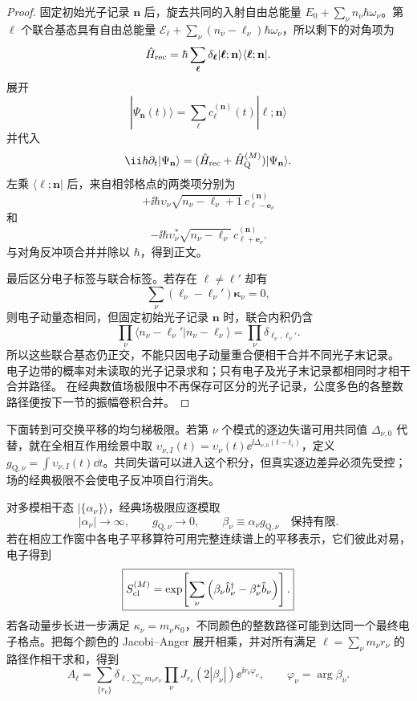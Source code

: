\begin{proof}
固定初始光子记录 $\mathbf n$ 后，旋去共同的入射自由总能量 $E_0+\sum_\nu n_\nu\hbar\omega_\nu$。第 $\boldsymbol\ell$ 个联合基态具有自由总能量 $\mathcal E_{\boldsymbol\ell}+\sum_\nu(n_\nu-\ell_\nu)\hbar\omega_\nu$，所以剩下的对角项为
\[
\hat H_{\rm rec}
=
\hbar\sum_{\boldsymbol\ell}
\delta_{\boldsymbol\ell}
|\boldsymbol\ell;\mathbf n\rangle\langle\boldsymbol\ell;\mathbf n|.
\]
展开
\[
|\Psi_{\mathbf n}(t)\rangle
=
\sum_{\boldsymbol\ell}
c_{\boldsymbol\ell}^{(\mathbf n)}(t)
|\boldsymbol\ell;\mathbf n\rangle
\]
并代入
\[
\ii\hbar\partial_t|\Psi_{\mathbf n}\rangle
=
(\hat H_{\rm rec}+\hat H_{\rm Q}^{(M)})
|\Psi_{\mathbf n}\rangle.
\]
左乘 $\langle\boldsymbol\ell;\mathbf n|$ 后，来自相邻格点的两类项分别为
\[
+\ii\hbar
\upsilon_\nu
\sqrt{n_\nu-\ell_\nu+1}\,
c_{\boldsymbol\ell-\mathbf e_\nu}^{(\mathbf n)}
\]
和
\[
-\ii\hbar
\upsilon_\nu^*
\sqrt{n_\nu-\ell_\nu}\,
c_{\boldsymbol\ell+\mathbf e_\nu}^{(\mathbf n)}.
\]
与对角反冲项合并并除以 $\hbar$，得到正文。

最后区分电子标签与联合标签。若存在
$\boldsymbol\ell\neq\boldsymbol\ell\prime$ 却有
\[
\sum_\nu(\ell_\nu-\ell_\nu\prime)\boldsymbol\kappa_\nu=0,
\]
则电子动量态相同，但固定初始光子记录 $\mathbf n$ 时，联合内积仍含
\[
\prod_\nu\langle n_\nu-\ell_\nu\prime|n_\nu-\ell_\nu\rangle
=\prod_\nu\delta_{\ell_\nu,\ell_\nu\prime}.
\]
所以这些联合基态仍正交，不能只因电子动量重合便相干合并不同光子末记录。
电子边带的概率对未读取的光子记录求和；只有电子及光子末记录都相同时才相干合并路径。
在经典数值场极限中不再保存可区分的光子记录，公度多色的各整数路径便按下一节的振幅卷积合并。
\end{proof}


下面转到可交换平移的均匀梯极限。若第 $\nu$ 个模式的逐边失谐可用共同值 $\Delta_{\nu,0}$ 代替，就在全相互作用绘景中取 $\upsilon_{\nu,I}(t)=\upsilon_\nu(t)\ee^{\ii\Delta_{\nu,0}(t-t_i)}$，定义 $g_{\mathrm Q,\nu}=\int\upsilon_{\nu,I}(t)\dd t$。共同失谐可以进入这个积分，但真实逐边差异必须先受控；场的经典极限不会使电子反冲项自行消失。

对多模相干态
$|\{\alpha_\nu\}\rangle$，经典场极限应逐模取
\[
|\alpha_\nu|\to\infty,
\qquad
g_{\mathrm Q,\nu}\to0,
\qquad
\beta_\nu
\equiv
\alpha_\nu g_{\mathrm Q,\nu}
\quad\text{保持有限}.
\]
若在相应工作窗中各电子平移算符可用完整连续谱上的平移表示，它们彼此对易，电子得到
\begin{equation}
\boxed{
 S_{\rm cl}^{(M)}
 =
 \exp\!\left[
 \sum_\nu
 \left(
 \beta_\nu\hat b_\nu^\dagger
 -\beta_\nu^*\hat b_\nu
 \right)
 \right].}
\label{eq:multicolor_classical_scattering_dp47}
\end{equation}
若各动量步长进一步满足
$\kappa_\nu=m_\nu\kappa_0$，不同颜色的整数路径可能到达同一个最终电子格点。把每个颜色的 Jacobi--Anger 展开相乘，并对所有满足
$\ell=\sum_\nu m_\nu r_\nu$
的路径作相干求和，得到
\begin{equation}
\boxed{
 A_\ell
 =\sum_{\{r_\nu\}}
 \delta_{\ell,\sum_\nu m_\nu r_\nu}
 \prod_\nu
 J_{r_\nu}(2|\beta_\nu|)
 \ee^{\ii r_\nu\varphi_\nu},
 \qquad
 \varphi_\nu=\arg\beta_\nu .}
\label{eq:multicolor_pinem_convolution_dp47}
\end{equation}

